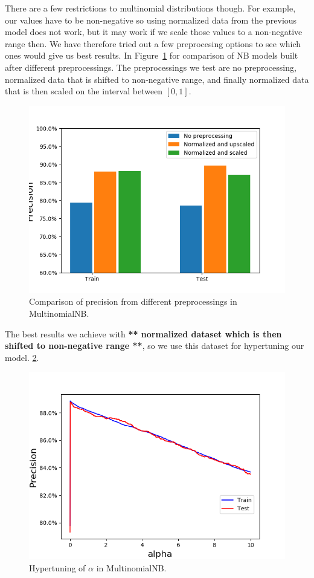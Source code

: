 \documentclass[11pt,a4paper]{article}
\begin{document}
There are a few restrictions to multinomial distributions though. For example, our values have to be non-negative so using normalized data from the previous model does not work, but it may work if we scale those values to a non-negative range then. We have therefore tried out a few preprocesing options to see which ones would give us best results. In Figure~\ref{fig:multinomialBayes_preprocessing} for comparison of NB models built after different preprocessings. The preprocessings we test are no preprocessing, normalized data that is shifted to non-negative range, and finally normalized data that is then scaled on the interval between $[0, 1]$. 
%
\begin{figure}[ht!]
\centering
\includegraphics[scale=0.60]{mNB_preprocessing_precision.png}
\caption{Comparison of precision from different preprocessings in MultinomialNB.}
\label{fig:multinomialBayes_preprocessing}
\end{figure}
%
The best results we achieve with \textbf{** normalized dataset which is then shifted to non-negative range **}, so we use this dataset for hypertuning our model. 
\ref{fig:multinomialBayes_hypertune}.
%
\begin{figure}[ht!]
\centering
\includegraphics[scale=0.60]{hypertune_mNB_precision.png}
\caption{Hypertuning of $\alpha$ in MultinomialNB.}
\label{fig:multinomialBayes_hypertune}
\end{figure}
\end{document}
